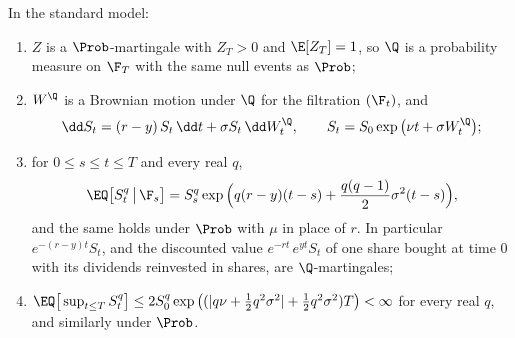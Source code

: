 \begin{lemma}\label{lem:sm-girsanov}
In the standard model:
\begin{enumerate}[label=(\roman*)]
  \item $Z$ is a $\Prob$-martingale with $Z_T>0$ and $\E[Z_T]=1$, so $\Q$ is a probability measure
    on $\F_T$ with the same null events as $\Prob$;
  \item $W^\Q$ is a Brownian motion under $\Q$ for the filtration $(\F_t)$, and
    \begin{equation}\label{eq:sm-Q}
      \dd S_t=(r-y)\,S_t\,\dd t+\sigma S_t\,\dd W^\Q_t,\qquad S_t=S_0\exp\big(\nu t+\sigma W^\Q_t\big);
    \end{equation}
  \item for $0\le s\le t\le T$ and every real $q$,
    \begin{equation}\label{eq:sm-moments}
      \EQ\big[S_t^q\,\big|\,\F_s\big]=S_s^q\exp\Big(q(r-y)(t-s)+\frac{q(q-1)}{2}\sigma^2(t-s)\Big),
    \end{equation}
    and the same holds under $\Prob$ with $\mu$ in place of $r$. In particular $e^{-(r-y)t}S_t$, and
    the discounted value $e^{-rt}\,e^{yt}S_t$ of one share bought at time $0$ with its dividends
    reinvested in shares, are $\Q$-martingales;
  \item $\EQ\big[\sup_{t\le T}S_t^q\big]\le2S_0^q\exp\big((|q\nu+\frac12q^2\sigma^2|+\frac12q^2\sigma^2)T\big)<\infty$
    for every real $q$, and similarly under $\Prob$.
\end{enumerate}
\end{lemma}

